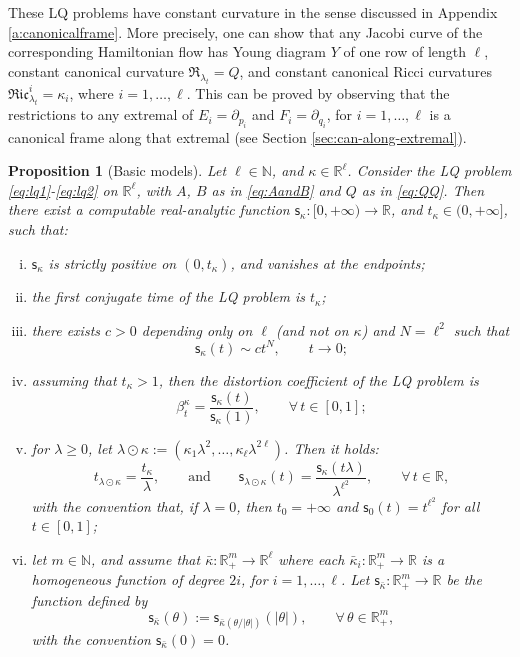 \documentclass[11pt,a4paper]{article}
\theoremstyle{plain}
\newtheorem{proposition}[theorem]{Proposition}
\theoremstyle{definition}
\theoremstyle{remark}
\numberwithin{equation}{section}
\newcommand{\R}{\mathbb{R}} %
\newcommand{\N}{\mathbb{N}} %
\newcommand{\sfs}{\mathsf{s}}
\begin{document}
These LQ problems have constant curvature in the sense discussed in Appendix \ref{a:canonicalframe}. More precisely, one can show that any Jacobi curve of the corresponding Hamiltonian flow has Young diagram $Y$ of one row of length $\ell$, constant canonical curvature $\mathfrak{R}_{\lambda_t} = Q$, and constant canonical Ricci curvatures $\mathfrak{Ric}_{\lambda_t}^{i} = \kappa_{i}$, where $i=1,\dots,\ell$. This can be proved by observing that the restrictions to any extremal of $E_i=\partial_{p_i}$ and $F_i =\partial_{q_i}$, for $i=1,\dots,\ell$ is a canonical frame along that extremal (see Section \ref{sec:can-along-extremal}).

\begin{proposition}[Basic models]\label{p:basic}
Let $\ell\in\N$, and $\kappa\in \R^\ell$. Consider the LQ problem \eqref{eq:lq1}-\eqref{eq:lq2} on $\R^\ell$, with $A$, $B$ as in \eqref{eq:AandB} and $Q$ as in \eqref{eq:QQ}. Then there exist a computable real-analytic function $\sfs_\kappa: [0,+\infty) \to \R$, and $t_\kappa \in (0,+\infty]$, such that:
\begin{enumerate}[(i)]
\item \label{i:basic-1} $\sfs_\kappa$ is strictly positive on $(0,t_\kappa)$, and vanishes at the endpoints;
\item \label{i:basic-2} the first conjugate time of the LQ problem is $t_\kappa$;
\item \label{i:basic-3} there exists $c>0$ depending only on $\ell$ (and not on $\kappa$) and $N=\ell^2$ such that 
\[
\sfs_\kappa(t) \sim c t^{N}, \qquad t \to 0;
\]
\item \label{i:basic-4} assuming that $t_\kappa>1$, then the distortion coefficient of the LQ problem is
\begin{equation}
\beta_t^{\kappa} = \frac{\sfs_\kappa(t)}{\sfs_\kappa(1)}, \qquad \forall\, t \in [0,1];
\end{equation}
\item \label{i:basic-5} for $\lambda\geq 0$, let $\lambda \odot \kappa :=(\kappa_1 \lambda^2,\dots,\kappa_\ell \lambda^{2\ell})$. Then it holds:
\begin{equation}
t_{\lambda\odot\kappa} = \frac{t_\kappa}{\lambda}, \qquad \text{and} \qquad \sfs_{\lambda\odot \kappa}(t) = \frac{\sfs_\kappa(t\lambda)}{\lambda^{\ell^2}} ,\qquad \forall\, t\in \R,
\end{equation}
with the convention that, if $\lambda=0$, then $t_0=+\infty$ and $\sfs_0(t) = t^{\ell^2}$ for all $t\in [0,1]$;
\item \label{i:basic-6} let $m\in \N$, and assume that $\bar{\kappa} : \R^m_+\to \R^\ell$ where each $\bar{\kappa}_i : \R^m_+ \to \R$ is a homogeneous function of degree $2i$, for $i=1,\dots,\ell$. Let $\sfs_{\bar{\kappa}}: \R^m_+ \to \R$ be the function defined by
\begin{equation}\label{eq:link}
\sfs_{\bar{\kappa}}(\theta) := \sfs_{\bar{\kappa}(\theta/|\theta|)}(|\theta|), \qquad \forall\, \theta \in \R^m_+,
\end{equation}
with the convention $\sfs_{\bar{\kappa}}(0) = 0$.


\end{enumerate}
\end{proposition}
\end{document}
